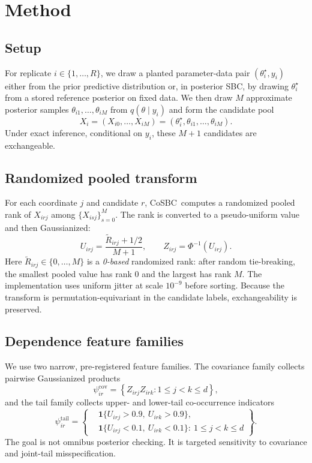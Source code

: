 \documentclass[10pt,twocolumn]{article}
\newcommand{\method}{CoSBC}
\newcommand{\R}{R}
\newcommand{\M}{M}
\newcommand{\1}{\mathbf{1}}
\begin{document}
\section{Method}
\label{sec:method}
\subsection{Setup}
For replicate $i \in \{1,\dots,\R\}$, we draw a planted parameter-data pair $(\theta_i^\star, y_i)$ either from the prior predictive distribution or, in posterior SBC, by drawing $\theta_i^\star$ from a stored reference posterior on fixed data. We then draw $\M$ approximate posterior samples $\theta_{i1},\dots,\theta_{i\M}$ from $q(\theta \mid y_i)$ and form the candidate pool
\[
X_i = (X_{i0}, \dots, X_{i\M}) = (\theta_i^\star, \theta_{i1}, \dots, \theta_{i\M}).
\]
Under exact inference, conditional on $y_i$, these $\M+1$ candidates are exchangeable.

\subsection{Randomized pooled transform}
For each coordinate $j$ and candidate $r$, \method\ computes a randomized pooled rank of $X_{irj}$ among $\{X_{isj}\}_{s=0}^{\M}$. The rank is converted to a pseudo-uniform value and then Gaussianized:
\[
U_{irj} = \frac{\widetilde R_{irj}+1/2}{\M+1},
\qquad
Z_{irj} = \Phi^{-1}(U_{irj}).
\]
Here $\widetilde R_{irj} \in \{0,\dots,\M\}$ is a \emph{0-based} randomized rank: after random tie-breaking, the smallest pooled value has rank $0$ and the largest has rank $\M$. The implementation uses uniform jitter at scale $10^{-9}$ before sorting. Because the transform is permutation-equivariant in the candidate labels, exchangeability is preserved.

\subsection{Dependence feature families}
We use two narrow, pre-registered feature families. The covariance family collects pairwise Gaussianized products
\[
\psi_{ir}^{\mathrm{cov}} = \left\{ Z_{irj} Z_{irk} : 1 \le j < k \le d \right\},
\]
and the tail family collects upper- and lower-tail co-occurrence indicators
\[
\psi_{ir}^{\mathrm{tail}} =
\left\{
\begin{aligned}
&\1\{U_{irj}>0.9,\ U_{irk}>0.9\},\\
&\1\{U_{irj}<0.1,\ U_{irk}<0.1\}
:\ 1 \le j < k \le d
\end{aligned}
\right\}.
\]
The goal is not omnibus posterior checking. It is targeted sensitivity to covariance and joint-tail misspecification.
\end{document}
